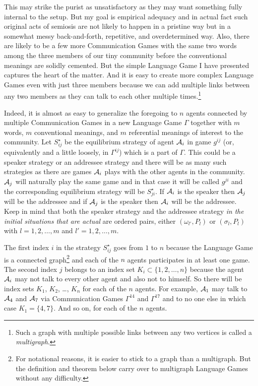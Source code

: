 This may strike the purist as unsatisfactory as they may want something fully internal to the setup. But my goal is empirical adequacy and in actual fact such original acts of semiosis are not likely to happen in a pristine way but in a somewhat messy back-and-forth, repetitive, and overdetermined way. Also, there are likely to be a few more Communication Games with the same two words among the three members of our tiny community before the conventional meanings are solidly cemented. But the simple Language Game I have presented captures the heart of the matter. And it is easy to create more complex Language Games even with just three members because we can add multiple links between any two members as they can talk to each other multiple times.\footnote{Such a graph with multiple possible links between any two vertices is called a \emph{multigraph}.}

Indeed, it is almost as easy to generalize the foregoing to $n$ agents connected by multiple Communication Games in a new Language Game $\Gamma$ together with $m$ words, $m$ conventional meanings, and $m$ referential meanings of interest to the community. Let $S^\star_{ij}$ be the equilibrium strategy of agent ${\cal A}_i$ in game $g^{ij}$ (or, equivalently and a little loosely, in $\Gamma^{ij}$) which is a part of $\Gamma$. This could be a speaker strategy or an addressee strategy and there will be as many such strategies as there are games ${\cal A}_i$ plays with the other agents in the community. ${\cal A}_j$ will naturally play the same game and in that case it will be called $g^{ji}$ and the corresponding equilibrium strategy will be $S^\star_{ji}$. If ${\cal A}_i$ is the speaker then ${\cal A}_j$ will be the addressee and if ${\cal A}_j$ is the speaker then ${\cal A}_i$ will be the addressee. Keep in mind that both the speaker strategy and the addressee strategy \emph{in the initial situations that are actual} are ordered pairs, either $(\omega_{l'},P_l)$ or $(\sigma_l,P_l)$ with $l = 1, 2, \ldots, m$ and $l' = 1, 2, \ldots, m$.

The first index $i$ in the strategy $S^\star_{ij}$ goes from $1$ to $n$ because the Language Game is a connected graph\footnote{For notational reasons, it is easier to stick to a graph than a multigraph. But the definition and theorem below carry over to multigraph Language Games without any difficulty.} and each of the $n$ agents participates in at least one game. The second index $j$ belongs to an index set $K_i \subset \{1, 2, \ldots, n\}$ because the agent ${\cal A}_i$ may not talk to every other agent and also not to himself. So there will be index sets $K_1$, $K_2$, \ldots, $K_n$ for each of the $n$ agents. For example, ${\cal A}_1$ may talk to ${\cal A}_4$ and ${\cal A}_7$ via Communication Games $\Gamma^{14}$ and $\Gamma^{17}$ and to no one else in which case $K_1 = \{4,7\}$. And so on, for each of the $n$ agents. 

